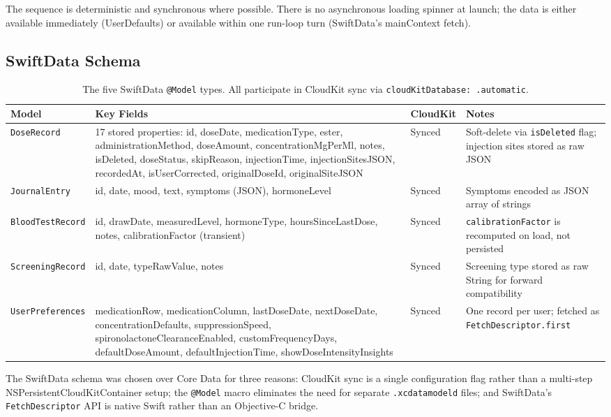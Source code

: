 \documentclass[11pt,a4paper]{article}
\newcommand{\code}[1]{\texttt{\small #1}}
\begin{document}
The sequence is deterministic and synchronous where possible. There is no
asynchronous loading spinner at launch; the data is either available
immediately (UserDefaults) or available within one run-loop turn
(SwiftData's mainContext fetch).

\subsection{SwiftData Schema}
\label{sec:swiftdata_schema}

\begin{table}[h]
\centering
\small
\begin{tabular}{@{}p{2.5cm}p{5.2cm}p{2.2cm}p{4.6cm}@{}}
\toprule
\textbf{Model} & \textbf{Key Fields} & \textbf{CloudKit} & \textbf{Notes} \\
\midrule
\code{DoseRecord} &
  17 stored properties: id, doseDate, medicationType, ester,
  administrationMethod, doseAmount, concentrationMgPerMl, notes, isDeleted,
  doseStatus, skipReason, injectionTime, injectionSitesJSON, recordedAt,
  isUserCorrected, originalDoseId, originalSiteJSON &
  Synced &
  Soft-delete via \code{isDeleted} flag; injection sites stored as raw JSON \\
\midrule
\code{JournalEntry} &
  id, date, mood, text, symptoms (JSON), hormoneLevel &
  Synced &
  Symptoms encoded as JSON array of strings \\
\midrule
\code{BloodTestRecord} &
  id, drawDate, measuredLevel, hormoneType, hoursSinceLastDose, notes,
  calibrationFactor (transient) &
  Synced &
  \code{calibrationFactor} is recomputed on load, not persisted \\
\midrule
\code{ScreeningRecord} &
  id, date, typeRawValue, notes &
  Synced &
  Screening type stored as raw String for forward compatibility \\
\midrule
\code{UserPreferences} &
  medicationRow, medicationColumn, lastDoseDate, nextDoseDate,
  concentrationDefaults, suppressionSpeed, spironolactoneClearanceEnabled,
  customFrequencyDays, defaultDoseAmount, defaultInjectionTime,
  showDoseIntensityInsights &
  Synced &
  One record per user; fetched as \code{FetchDescriptor.first} \\
\bottomrule
\end{tabular}
\caption{The five SwiftData \code{@Model} types. All participate in CloudKit
sync via \code{cloudKitDatabase: .automatic}.}
\label{tab:swiftdata_models}
\end{table}

The SwiftData schema was chosen over Core Data for three reasons: CloudKit
sync is a single configuration flag rather than a multi-step NSPersistentCloudKitContainer
setup; the \code{@Model} macro eliminates the need for separate
\code{.xcdatamodeld} files; and SwiftData's \code{FetchDescriptor} API is
native Swift rather than an Objective-C bridge.
\end{document}
